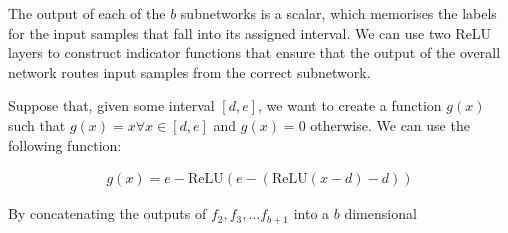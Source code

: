 The output of each of the $b$ subnetworks is a scalar, which memorises the labels for the input samples that fall into its assigned interval.  We can use two ReLU layers to construct indicator functions that ensure that the output of the overall network routes input samples from the correct subnetwork.

Suppose that, given some interval $[d, e]$,  we want to create a function $g(x)$ such that $g(x) = x \forall x \in [d, e]$ and $g(x) = 0$ otherwise. We can use the following function:

\begin{align}
  g(x) = e - \text{ReLU}(e - (\text{ReLU}(x - d) - d))
\end{align}

By concatenating the outputs of $f_2, f_3, \dots f_{b+1}$ into a $b$ dimensional 

